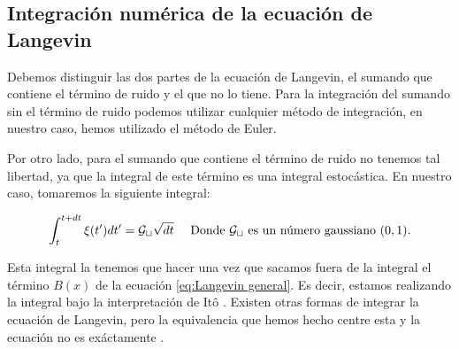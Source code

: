 \subsection{Integración numérica de la ecuación de Langevin}

Debemos distinguir las dos partes de la ecuación de Langevin, el sumando que contiene el término de ruido y el que no lo tiene.
Para la integración del sumando sin el término de ruido podemos utilizar cualquier método de integración, en nuestro caso, hemos utilizado
el método de Euler. 

Por otro lado, para el sumando que contiene el término de ruido no tenemos tal libertad, ya que la integral de este término es una integral 
estocástica. En nuestro caso, tomaremos la siguiente integral:

$$\int_{t}^{t+dt}\xi(t^\prime)dt^\prime=\mathcal{G_t}\sqrt{dt}\quad \textup{	Donde $\mathcal{G_t}$ es un número gaussiano $(0,1)$.}$$

Esta integral la tenemos que hacer una vez que sacamos fuera de la integral el término $B(x)$ de la ecuación \ref{eq:Langevin general}.
Es decir, estamos realizando la integral bajo la interpretación de Itô \cite{McKane}.
Existen otras formas de integrar la ecuación de Langevin, pero la equivalencia que hemos hecho centre esta y la ecuación no es exáctamente \cite{Toral}.
